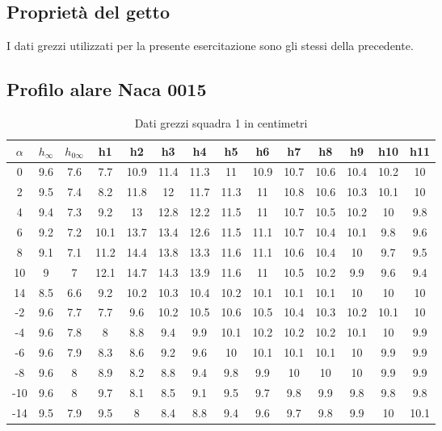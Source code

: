 \subsection{Proprietà del getto}\label{a4}
I dati grezzi utilizzati per la presente esercitazione sono gli stessi della precedente.

\subsection{Profilo alare Naca 0015}\label{a5}
\begin{table}[h]
\centering
\begin{tabular}{|c|c|c|c|c|c|c|c|c|c|c|c|c|c|}
\hline
$\alpha$ & $h_\infty$ & $h_{0\infty}$ & h1   & h2   & h3   & h4   & h5   & h6   & h7   & h8   & h9   & h10  & h11  \\ \hline
0        & 9.6        & 7.6           & 7.7  & 10.9 & 11.4 & 11.3 & 11   & 10.9 & 10.7 & 10.6 & 10.4 & 10.2 & 10   \\ \hline
2        & 9.5        & 7.4           & 8.2  & 11.8 & 12   & 11.7 & 11.3 & 11   & 10.8 & 10.6 & 10.3 & 10.1 & 10   \\ \hline
4        & 9.4        & 7.3           & 9.2  & 13   & 12.8 & 12.2 & 11.5 & 11   & 10.7 & 10.5 & 10.2 & 10   & 9.8  \\ \hline
6        & 9.2        & 7.2           & 10.1 & 13.7 & 13.4 & 12.6 & 11.5 & 11.1 & 10.7 & 10.4 & 10.1 & 9.8  & 9.6  \\ \hline
8        & 9.1        & 7.1           & 11.2 & 14.4 & 13.8 & 13.3 & 11.6 & 11.1 & 10.6 & 10.4 & 10   & 9.7  & 9.5  \\ \hline
10       & 9          & 7             & 12.1 & 14.7 & 14.3 & 13.9 & 11.6 & 11   & 10.5 & 10.2 & 9.9  & 9.6  & 9.4  \\ \hline
14       & 8.5        & 6.6           & 9.2  & 10.2 & 10.3 & 10.4 & 10.2 & 10.1 & 10.1 & 10.1 & 10   & 10   & 10   \\ \hline
-2       & 9.6        & 7.7           & 7.7  & 9.6  & 10.2 & 10.5 & 10.6 & 10.5 & 10.4 & 10.3 & 10.2 & 10.1 & 10   \\ \hline
-4       & 9.6        & 7.8           & 8    & 8.8  & 9.4  & 9.9  & 10.1 & 10.2 & 10.2 & 10.2 & 10.1 & 10   & 9.9  \\ \hline
-6       & 9.6        & 7.9           & 8.3  & 8.6  & 9.2  & 9.6  & 10   & 10.1 & 10.1 & 10.1 & 10   & 9.9  & 9.9  \\ \hline
-8       & 9.6        & 8             & 8.9  & 8.2  & 8.8  & 9.4  & 9.8  & 9.9  & 10   & 10   & 10   & 9.9  & 9.9  \\ \hline
-10      & 9.6        & 8             & 9.7  & 8.1  & 8.5  & 9.1  & 9.5  & 9.7  & 9.8  & 9.9  & 9.8  & 9.8  & 9.8  \\ \hline
-14      & 9.5        & 7.9           & 9.5  & 8    & 8.4  & 8.8  & 9.4  & 9.6  & 9.7  & 9.8  & 9.9  & 10   & 10.1 \\ \hline
\end{tabular}
\caption{Dati grezzi squadra 1 in centimetri}
\end{table}

